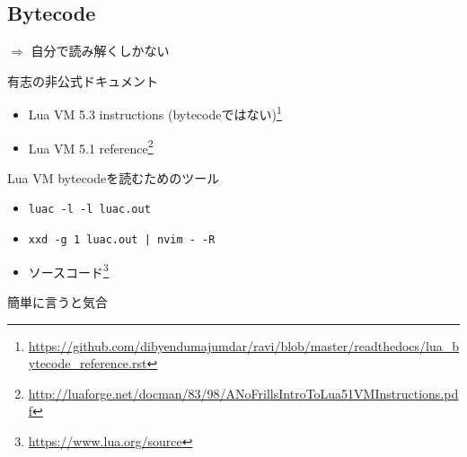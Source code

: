 \subsection{Bytecode}
\begin{frame}
	\frametitlesubs
	\begin{figure}
		\centering
	\end{figure}

	\pause
	\vspace{3\zw}
	\begin{center}
		$\Rightarrow$ \alert{自分で読み解くしかない}
	\end{center}
\end{frame}
\begin{frame}
	\frametitlesubs

	有志の非公式ドキュメント
	\begin{itemize}
		\item Lua VM 5.3 instructions (bytecodeではない)\footnote{\url{https://github.com/dibyendumajumdar/ravi/blob/master/readthedocs/lua_bytecode_reference.rst}}
		\item Lua VM 5.1 reference\footnote{\url{http://luaforge.net/docman/83/98/ANoFrillsIntroToLua51VMInstructions.pdf}}
	\end{itemize}
	\pause

	Lua VM bytecodeを読むためのツール
	\begin{itemize}
		\item \lstinline{luac -l -l luac.out}
		\item \lstinline{xxd -g 1 luac.out | nvim - -R}\pause
		\item ソースコード\footnote{\url{https://www.lua.org/source}}
	\end{itemize}

	\pause
	\begin{center}
		簡単に言うと\alert{\Huge{}気合}
	\end{center}
\end{frame}
